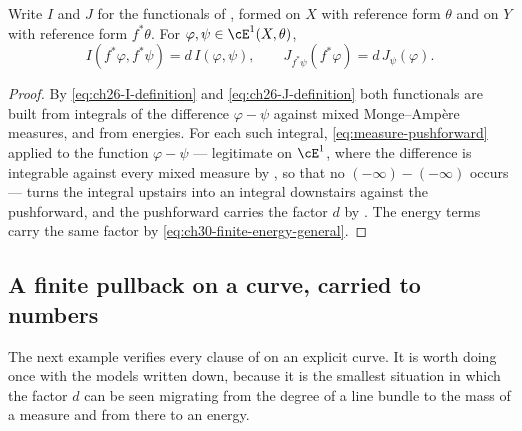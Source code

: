 \begin{corollary}
\label{cor:ch30-finite-IJ}
Write \(I\) and \(J\) for the functionals of , formed on
\(X\) with reference form \(\theta\) and on \(Y\) with reference form
\(f^*\theta\).  For \(\varphi,\psi\in\cE^1(X,\theta)\),
\begin{equation}
\label{eq:ch30-finite-IJ}
 I(f^*\varphi,f^*\psi)=d\,I(\varphi,\psi),
 \qquad
 J_{f^*\psi}(f^*\varphi)=d\,J_\psi(\varphi).
\end{equation}
\end{corollary}

\begin{proof}
By \eqref{eq:ch26-I-definition} and \eqref{eq:ch26-J-definition} both
functionals are built from integrals of the difference \(\varphi-\psi\)
against mixed Monge--Amp\`ere measures, and from energies.  For each such
integral, \eqref{eq:measure-pushforward} applied to the function
\(\varphi-\psi\) --- legitimate on \(\cE^1\), where the difference is
integrable against every mixed measure by
, so that no \((-\infty)-(-\infty)\) occurs ---
turns the integral upstairs into an integral downstairs against the
pushforward, and the pushforward carries the factor \(d\) by
.  The energy terms carry the same
factor by \eqref{eq:ch30-finite-energy-general}.
\end{proof}

\subsection{A finite pullback on a curve, carried to numbers}
\label{sec:ch30-finite-example}

The next example verifies every clause of
 on an explicit
curve.  It is worth doing once with the models written down, because it is
the smallest situation in which the factor \(d\) can be seen migrating from
the degree of a line bundle to the mass of a measure and from there to an
energy.


